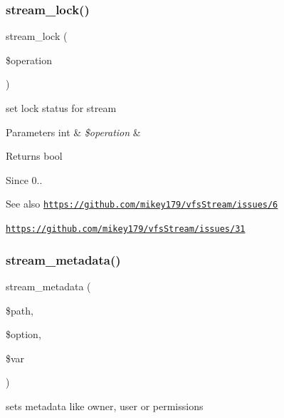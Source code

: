 \subsubsection{\texorpdfstring{stream\+\_\+lock()}{stream\_lock()}}
{\footnotesize\ttfamily stream\+\_\+lock (\begin{DoxyParamCaption}\item[{}]{\$operation }\end{DoxyParamCaption})}

set lock status for stream


\begin{DoxyParams}[1]{Parameters}
int & {\em \$operation} & \\
\hline
\end{DoxyParams}
\begin{DoxyReturn}{Returns}
bool 
\end{DoxyReturn}
\begin{DoxySince}{Since}
0.. 
\end{DoxySince}
\begin{DoxySeeAlso}{See also}
\href{https://github.com/mikey179/vfsStream/issues/6}{\tt https\+://github.\+com/mikey179/vfs\+Stream/issues/6} 

\href{https://github.com/mikey179/vfsStream/issues/31}{\tt https\+://github.\+com/mikey179/vfs\+Stream/issues/31} 
\end{DoxySeeAlso}
\mbox{\label{classorg_1_1bovigo_1_1vfs_1_1vfs_stream_wrapper_a7eb65965e207cce9913bda3846e2a3ce}} 
\subsubsection{\texorpdfstring{stream\+\_\+metadata()}{stream\_metadata()}}
{\footnotesize\ttfamily stream\+\_\+metadata (\begin{DoxyParamCaption}\item[{}]{\$path,  }\item[{}]{\$option,  }\item[{}]{\$var }\end{DoxyParamCaption})}

sets metadata like owner, user or permissions


